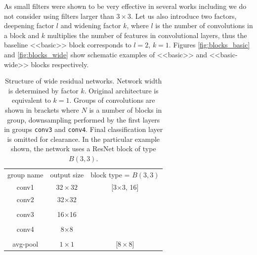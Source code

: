 \documentclass{bmvc2k}
\begin{document}
As small filters were shown to be very effective in several works including \cite{Simonyan15,inception-v4} we do not  consider using filters larger than $3\times3$.
Let us also introduce two factors, deepening factor $l$ and widening factor $k$, where $l$ is the number of convolutions in a block and $k$ multiplies the number of features in convolutional layers, thus the baseline <<basic>> block corresponds to  $l = 2$, $k = 1$. Figures \ref{fig:blocks_basic} and \ref{fig:blocks_wide} show schematic examples of <<basic>> and <<basic-wide>> blocks respectively.


\newcommand{\blocka}[2]{
  \(\left[
      \begin{array}{c}
        \text{3$\times$3, #1}\\[-.1em]
        \text{3$\times$3, #1}
      \end{array}
    \right]\)$\times$#2
}
\newcommand{\blockb}[2]{
  \(\left[
      \begin{array}{c}
        \text{3$\times$3, #1}\\[-.1em]
        \text{1$\times$1, #1}\\[-.1em]
        \text{3$\times$3, #1}
      \end{array}
    \right]\)$\times$#2
}
\newcommand{\convsize}[1]{#1$\times$#1}
\newcommand{\convname}[1]{#1}
\def\cellheight{0.34cm}
\begin{table}
  \centering
  \begin{tabular}{c|c|c}
    \hline
    group name & output size & block type = $B(3,3)$ \\
    \Xhline{2\arrayrulewidth}
    conv1 & $32\times32$ & [3$\times$3, 16] \\
    \convname{conv2} & \convsize{32} & \blocka{16$\times$k}{N} \\[\cellheight]
    \convname{conv3} & \convsize{16} & \blocka{32$\times$k}{N} \\[\cellheight]
    \convname{conv4} & \convsize{8} & \blocka{64$\times$k}{N} \\
    avg-pool & $1\times1$ & [$8\times8$] \\
    \hline
  \end{tabular}
  \vspace{0.2cm}
  \caption{Structure of wide residual networks. Network width is determined by factor $k$. Original architecture \cite{basicblock2} is equivalent to $k=1$. Groups of convolutions are shown in brackets where $N$ is a number of blocks in group, downsampling performed by the first layers in groups \texttt{conv3} and \texttt{conv4}. Final classification layer is omitted for clearance. In the particular example shown, the network uses  a ResNet block of type  $B(3,3)$. }
  \label{table:arch}
\end{table}
\end{document}
